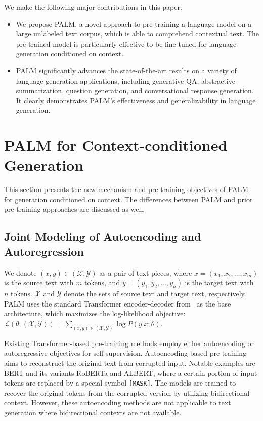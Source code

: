 \documentclass[11pt,a4paper]{article}
\newcommand{\method}{PALM\xspace}
\begin{document}
We make the following major contributions in this paper:
\begin{itemize}
    \item We propose \method, a novel approach to pre-training a language model on a large unlabeled text corpus, which is able to comprehend contextual text. The pre-trained model is particularly effective to be fine-tuned for language generation conditioned on context.
    \item \method significantly advances the state-of-the-art results on a variety of language generation applications, including generative QA, abstractive summarization, question generation, and conversational response generation. It clearly demonstrates \method's effectiveness and generalizability in language generation.
\end{itemize}

\section{\method for Context-conditioned Generation}
This section presents the new mechanism and pre-training objectives of \method for generation conditioned on context. The differences between \method and prior pre-training approaches are discussed as well.

\subsection{Joint Modeling of Autoencoding and Autoregression}
We denote $(x,y)\in (\mathcal{X},\mathcal{Y})$ as a pair of text pieces, where $x=(x_1,x_2,\dots,x_m)$ is the source text with $m$ tokens, and $y=(y_1,y_2,\dots,y_n)$ is the target text with $n$ tokens. $\mathcal{X}$ and $\mathcal{Y}$ denote the sets of source text and target text, respectively. \method uses the standard Transformer encoder-decoder from~\cite{Vaswani17attention} as the base architecture, which maximizes the log-likelihood objective: $\mathcal{L}(\theta;(\mathcal{X},\mathcal{Y}))=\sum_{(x,y)\in (\mathcal{X},\mathcal{Y})}\log P(y|x;\theta)$.

Existing Transformer-based pre-training methods employ either autoencoding or autoregressive objectives for self-supervision. Autoencoding-based pre-training aims to reconstruct the original text from corrupted input. Notable examples are BERT and its variants RoBERTa and ALBERT, where a certain portion of input tokens are replaced by a special symbol \texttt{[MASK]}. The models are trained to recover the original tokens from the corrupted version by utilizing bidirectional context. However, these autoencoding methods are not applicable to text generation where bidirectional contexts are not available.
\end{document}
